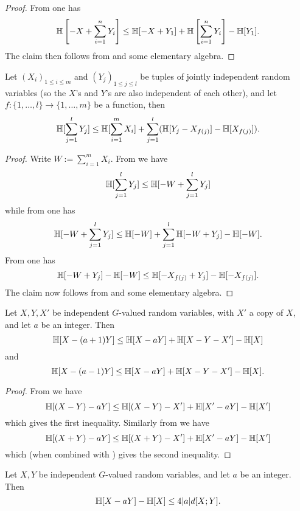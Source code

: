\begin{proof}\leanok
  From  one has
  $$ \mathbb{H}\left[-X + \sum_{i=1}^n Y_i\right] \leq \mathbb{H}[ - X + Y_1 ] + \mathbb{H}\left[ \sum_{i=1}^n Y_i \right] - \mathbb{H}[Y_1].$$
  The claim then follows from  and some elementary algebra.
\end{proof}

\begin{lemma}\label{compare-sums}\leanok  Let $(X_i)_{1 \leq i \leq m}$ and $(Y_j)_{1 \leq j \leq l}$ be tuples of jointly independent random variables (so the $X$'s and $Y$'s are also independent of each other), and let $f: \{1,\dots,l\} \to \{1,\dots,m\}$ be a function, then
  $$ \mathbb{H}[\sum_{j=1}^l Y_j] \leq \mathbb{H}[ \sum_{i=1}^m X_i ] + \sum_{j=1}^l (\mathbb{H}[ Y_j - X_{f(j)}] - \mathbb{H}[X_{f(j)}]).$$
\end{lemma}

\begin{proof}  Write $W := \sum_{i=1}^m X_i$.  From  we have
$$ \mathbb{H}[\sum_{j=1}^l Y_j]  \leq \mathbb{H}[-W + \sum_{j=1}^l Y_j]$$
while from  one has
$$ \mathbb{H}[-W + \sum_{j=1}^l Y_j] \leq \mathbb{H}[-W] + \sum_{j=1}^l \mathbb{H}[-W + Y_j] - \mathbb{H}[-W].$$
From  one has
$$ \mathbb{H}[-W + Y_j] - \mathbb{H}[-W] \leq \mathbb{H}[-X_{f(j)} + Y_j] - \mathbb{H}[-X_{f(j)}].$$
The claim now follows from  and some elementary algebra.
\end{proof}

\begin{lemma}\label{sum-dilate-I}\leanok  Let $X,Y,X'$ be independent $G$-valued random variables, with $X'$ a copy of $X$, and let $a$ be an integer.  Then
$$\mathbb{H}[X-(a+1)Y] \leq \mathbb{H}[X-aY] + \mathbb{H}[X-Y-X'] - \mathbb{H}[X]$$
and
$$\mathbb{H}[X-(a-1)Y] \leq \mathbb{H}[X-aY] + \mathbb{H}[X-Y-X'] - \mathbb{H}[X].$$
\end{lemma}

\begin{proof}\leanok
From  we have
$$ \mathbb{H}[(X-Y)-aY] \leq \mathbb{H}[(X-Y) - X'] + \mathbb{H}[X'-aY] - \mathbb{H}[X']$$
which gives the first inequality.  Similarly from  we have
$$ \mathbb{H}[(X+Y)-aY] \leq \mathbb{H}[(X+Y) - X'] + \mathbb{H}[X'-aY] - \mathbb{H}[X']$$
which (when combined with ) gives the second inequality.
\end{proof}

\begin{lemma}\label{sum-dilate-II}\leanok  Let $X,Y$ be independent $G$-valued random variables, and let $a$ be an integer.  Then
  $$\mathbb{H}[X-aY] - \mathbb{H}[X] \leq 4 |a| d[X;Y].$$
\end{lemma}

